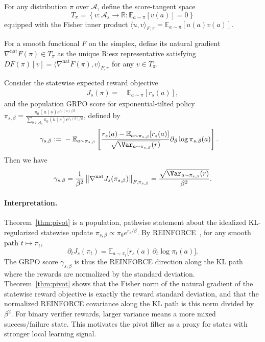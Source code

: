 \begin{theorem}\label{thm:pivot}
For any distribution $\pi$ over $\mathcal{A}$, define the score-tangent space 
$$T_\pi = \left\{ v : \mathcal{A}_s \to \mathbb{R}: \mathbb{E}_{a \sim \pi}[v(a)] = 0 \right\}$$
equipped with the Fisher inner product $\langle u, v \rangle_{F,\pi} = \mathbb{E}_{a \sim \pi}[u(a)v(a)]$.

For a smooth functional $F$ on the simplex, define its natural gradient $\nabla^{\mathrm{nat}}F(\pi) \in T_\pi$ as the unique Riesz representative satisfying $D F(\pi)[v]
= \langle \nabla^{\mathrm{nat}}F(\pi), v \rangle_{F,\pi}$ for any $v \in T_\pi$.

Consider the statewise expected reward objective
\begin{align*}
J_s(\pi)
= &~ \mathbb{E}_{a \sim \pi}[r_s(a)],
\end{align*}
and the population GRPO score for exponential-tilted policy $\pi_{s,\beta} = \frac{\pi_0(a \mid s)e^{r_s(a)/\beta}}{\sum_{b \in \mathcal{A}_s}\pi_0(b \mid s)e^{r_s(b)/\beta}}$, defined by
\begin{align*}
\gamma_{s,\beta}
:= &~ -\mathbb{E}_{a \sim \pi_{s,\beta}}
\left[
\frac{r_s(a) - \mathbb{E}_{a \sim \pi_{s,\beta}}[r_s(a)] }{\sqrt{\Var_{a \sim \pi_{s,\beta}}(r)}} \partial_\beta \log \pi_{s,\beta} (a)
\right].
\end{align*}
Then we have 
\begin{align*}
\gamma_{s,\beta} = \frac{1}{\beta^2}
\left\|\nabla^{\mathrm{nat}} J_s(\pi_{s,\beta})\right\|_{F,\pi_{s,\beta}} = \frac{\sqrt{\Var_{a \sim \pi_{s,\beta}}(r)}}{\beta^2}.
\end{align*}
\end{theorem}

\paragraph{Interpretation.} 
Theorem~\ref{thm:pivot} is a population, pathwise statement about the idealized
KL-regularized statewise update $\pi_{s,\beta}\propto \pi_0 e^{r_s/\beta}$.
By REINFORCE~\citep{williams1992simple},
for any smooth path $t \mapsto \pi_t$,
\[
\partial_t J_s(\pi_t)
=
\mathbb{E}_{a \sim \pi_t}
\bigl[
r_s(a)\,\partial_t \log \pi_t(a)
\bigr].
\]
The GRPO score $\gamma_{s,\beta}$ is thus the REINFORCE direction along the KL path where the rewards are normalized by the standard deviation. Theorem~\ref{thm:pivot} shows that the Fisher norm of the natural gradient of the statewise reward objective is exactly the reward standard deviation, and that the normalized REINFORCE covariance along the KL path is this norm divided by $\beta^2$. For binary verifier rewards, larger variance means a more mixed success/failure state. This motivates the pivot filter as a proxy for states with stronger local learning signal.
